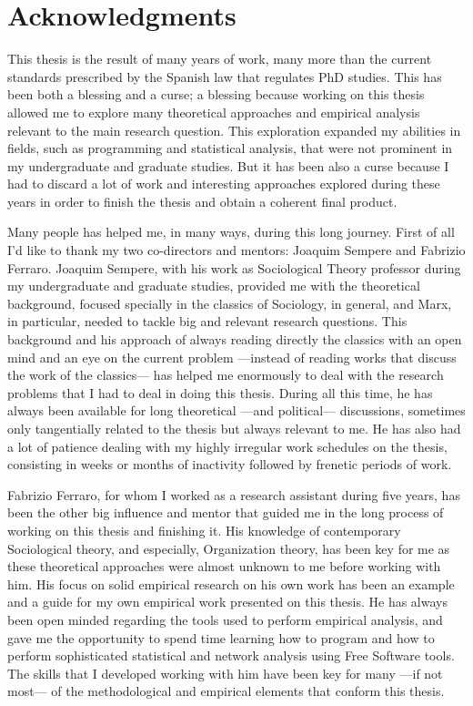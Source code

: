 \chapter*{Acknowledgments}

This thesis is the result of many years of work, many more than the current standards prescribed by the Spanish law that regulates PhD studies. This has been both a blessing and a curse; a blessing because working on this thesis allowed me to explore many theoretical approaches and empirical analysis relevant to the main research question. This exploration expanded my abilities in fields, such as programming and statistical analysis, that were not prominent in my undergraduate and graduate studies. But it has been also a curse because I had to discard a lot of work and interesting approaches explored during these years in order to finish the thesis and obtain a coherent final product.

Many people has helped me, in many ways, during this long journey. First of all I'd like to thank my two co-directors and mentors: Joaquim Sempere and Fabrizio Ferraro. Joaquim Sempere, with his work as Sociological Theory professor during my undergraduate and graduate studies, provided me with the theoretical background, focused specially in the classics of Sociology, in general, and Marx, in particular, needed to tackle big and relevant research questions. This background and his approach of always reading directly the classics with an open mind and an eye on the current problem ---instead of reading works that discuss the work of the classics--- has helped me enormously to deal with the research problems that I had to deal in doing this thesis. During all this time, he has always been available for long theoretical ---and political--- discussions, sometimes only tangentially related to the thesis but always relevant to me. He has also had a lot of patience dealing with my highly irregular work schedules on the thesis, consisting in weeks or months of inactivity followed by frenetic periods of work.

Fabrizio Ferraro, for whom I worked as a research assistant during five years, has been the other big influence and mentor that guided me in the long process of working on this thesis and finishing it. His knowledge of contemporary Sociological theory, and especially, Organization theory, has been key for me as these theoretical approaches were almost unknown to me before working with him. His focus on solid empirical research on his own work has been an example and a guide for my own empirical work presented on this thesis. He has always been open minded regarding the tools used to perform empirical analysis, and gave me the opportunity to spend time learning how to program and how to perform sophisticated statistical and network analysis using Free Software tools. The skills that I developed working with him have been key for many ---if not most--- of the methodological and empirical elements that conform this thesis.

